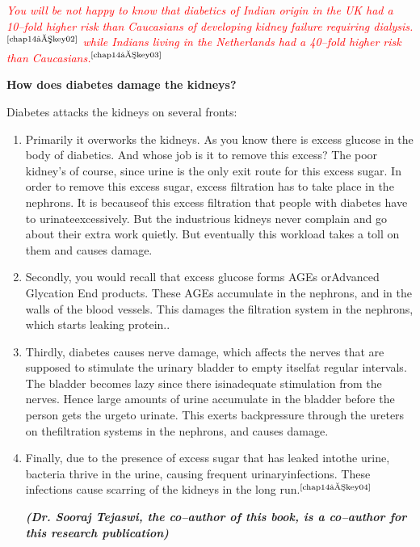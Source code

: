 \textcolor{red}{\textit{You will be not happy to know that diabetics of Indian origin in the UK had a 10–fold higher risk than Caucasians of developing kidney failure requiring dialysis.}}$^{\text{\cite{chap14–key02}}}$ \textcolor{red}{\textit{while Indians living in the Netherlands had a 40–fold higher risk than Caucasians.}}$^{\text{\cite{chap14–key03}}}$

\noindent\textbf{How does diabetes damage the kidneys?}

\noindent Diabetes attacks the kidneys on several fronts:

\vspace{-\topsep}
\begin{enumerate}[\ding{118}]
\itemsep=0pt
\item Primarily it overworks the kidneys. As you know there is excess glucose in the body of diabetics. And whose job is it to remove this excess? The poor kidney’s of course, since urine is the only exit route for this excess sugar. In order to remove this excess sugar, excess filtration has to take place in the nephrons. It is because\break of this excess filtration that people with diabetes have to urinate\break excessively. But the industrious kidneys never complain and go about their extra work quietly. But eventually this workload takes a toll on them and causes damage.
\item Secondly, you would recall that excess glucose forms AGEs or\break Advanced Glycation End products. These AGEs accumulate in the neph\-rons, and in the walls of the blood vessels. This damages the filtration system in the nephrons, which starts leaking protein..
\item Thirdly, diabetes causes nerve damage, which affects the nerves that are supposed to stimulate the urinary bladder to empty itself\break at regular intervals. The bladder becomes lazy since there is\break inadequate stimulation from the nerves. Hence large amounts of urine accumulate in the bladder before the person gets the urge\break to urinate. This exerts backpressure through the ureters on the\break filtration systems in the nephrons, and causes damage.
\item Finally, due to the presence of excess sugar that has leaked into\break the urine, bacteria thrive in the urine, causing frequent urinary\break infections. These infections cause scarring of the kidneys in the long run.$^{\text{\cite{chap14–key04}}}$

 \textbf{\textit{(Dr. Sooraj Tejaswi, the co–author of this book, is a co–author for this research publication)}}
 \end{enumerate}


